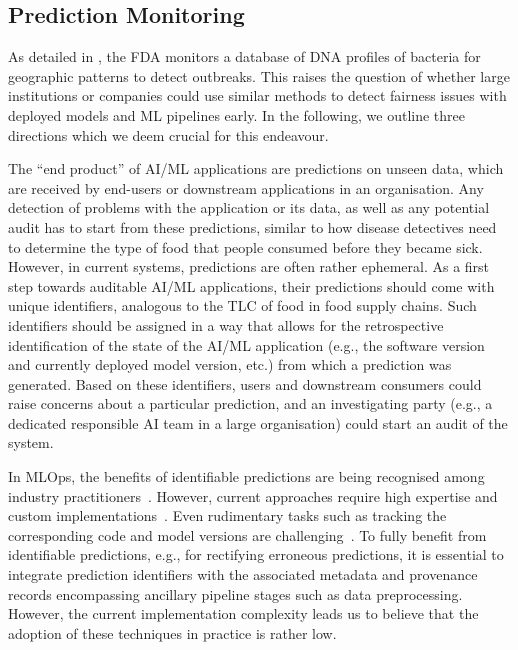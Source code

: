 \subsection{Prediction Monitoring}
\label{sec:vision-monitoring}

As detailed in , the FDA monitors a database of DNA profiles of bacteria for geographic patterns to detect outbreaks. This raises the question of whether large institutions or companies could use similar methods to detect fairness issues with deployed models and ML pipelines early. In the following, we outline three directions which we deem crucial for this endeavour.

 The ``end product'' of AI/ML applications are predictions on unseen data, which are received by end-users or downstream applications in an organisation. Any detection of problems with the application or its data, as well as any potential audit has to start from these predictions, similar to how disease detectives need to determine the type of food that people consumed before they became sick. However, in current systems, predictions are often rather ephemeral. As a first step towards auditable AI/ML applications, their predictions should come with unique identifiers, analogous to the TLC of food in food supply chains. Such identifiers should be assigned in a way that allows for the retrospective identification of the state of the AI/ML application (e.g., the software version and currently deployed model version, etc.) from which a prediction was generated. Based on these identifiers, users and downstream consumers could raise concerns about a particular prediction, and an investigating party (e.g., a dedicated responsible AI team in a large organisation) could start an audit of the system.

 In MLOps, the benefits of identifiable predictions are being recognised among industry practitioners~\cite{tensorflowPatterns21,howToMonitor23}. However, current approaches require high expertise and custom implementations~\cite{tensorflowPatterns21}. Even rudimentary tasks such as tracking the corresponding code and model versions are challenging~\cite{traceabilityAndReproducibility23}. To fully benefit from identifiable predictions, e.g., for rectifying erroneous predictions, it is essential to integrate prediction identifiers with the associated metadata and provenance records encompassing ancillary pipeline stages such as data preprocessing. However, the current implementation complexity leads us to believe that the adoption of these techniques in practice is rather low.
  
